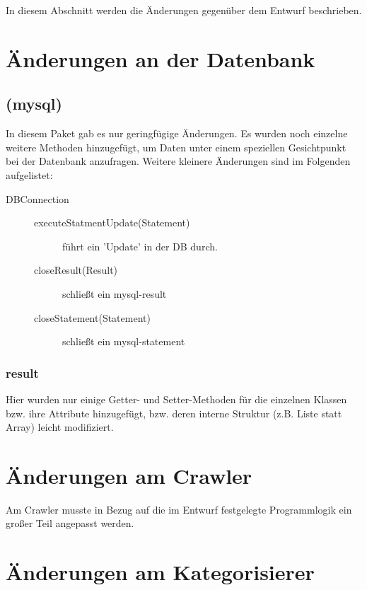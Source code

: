In diesem Abschnitt werden die Änderungen gegenüber dem Entwurf beschrieben.
\section{Änderungen an der Datenbank}
	  \subsection{(mysql)}
	In diesem Paket gab es nur geringfügige Änderungen. Es wurden noch einzelne weitere Methoden hinzugefügt, um Daten unter einem speziellen Gesichtpunkt bei der Datenbank anzufragen. Weitere kleinere Änderungen sind im Folgenden aufgelistet:
	\begin{description}
		\item [DBConnection] 
		\begin{description}
			\item[executeStatmentUpdate(Statement)] führt ein 'Update' in der DB durch.
			\item[closeResult(Result)] schließt ein mysql-result
			\item[closeStatement(Statement)] schließt ein mysql-statement
		\end{description}
	\end{description}
	
	\subsubsection{result}
	Hier wurden nur einige Getter- und Setter-Methoden für die einzelnen Klassen bzw. ihre Attribute hinzugefügt, bzw. deren interne Struktur (z.B. Liste statt Array) leicht modifiziert.

\section{Änderungen am Crawler}
Am Crawler musste  in Bezug auf die im Entwurf festgelegte Programmlogik ein großer Teil angepasst werden.

\section{Änderungen am Kategorisierer}

